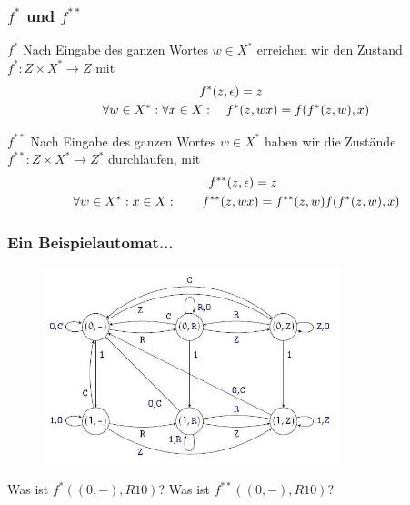 \begin{frame}
	\frametitle{$f^*$ und $f^{**}$}

	\begin{block}{$f^*$}
	   Nach Eingabe des ganzen Wortes $w \in X^*$ erreichen wir den Zustand $f^*: Z \times X^* \rightarrow Z $ mit
      \begin{align*}
				  f^*(z, \epsilon) &= z \\
				  \forall w\in X^*: \forall x\in X: \text{\quad}
				  f^*&(z, wx)   = f(f^*(z,w),x)
			\end{align*}
	\end{block}
	\pause
	\begin{block}{$f^{**}$}
		   Nach Eingabe des ganzen Wortes $w \in X^*$ haben wir die Zustände $f^{**}: Z \times X^* \rightarrow Z^* $ durchlaufen, mit
			\begin{align*}
				  f^{**}(z, \epsilon) &= z \\
				  \forall w\in X^*:  x\in X: \text{\qquad}
				  f^{**}(z, wx&)   = f^{**}(z,w) f(f^*(z,w),x)
			\end{align*}
	\end{block}
\end{frame}

\begin{frame}
	\frametitle{Ein Beispielautomat...}
		\begin{figure}
			\centering
				\includegraphics[height=5.7cm]{src/tut10_automat1.jpg}
		\end{figure}
		Was ist $f^*((0,-),R10)$? Was ist $f^{**}((0,-),R10)$?
\end{frame}

